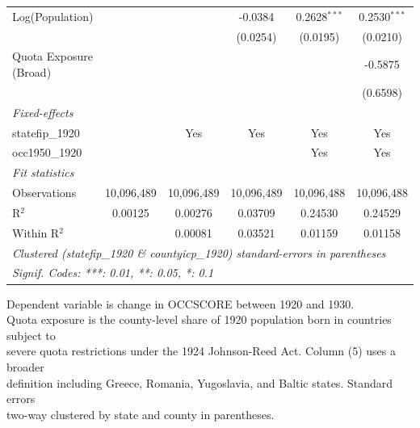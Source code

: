 \begin{table}[htbp]
\begin{tabular}{lccccc}
      Log(Population)        &                &                & -0.0384         & 0.2628$^{***}$  & 0.2530$^{***}$\\   
                             &                &                & (0.0254)        & (0.0195)        & (0.0210)\\   
      Quota Exposure (Broad) &                &                &                 &                 & -0.5875\\   
                             &                &                &                 &                 & (0.6598)\\   
      \midrule
      \emph{Fixed-effects}\\
      statefip\_1920         &                & Yes            & Yes             & Yes             & Yes\\  
      occ1950\_1920          &                &                &                 & Yes             & Yes\\  
      \midrule
      \emph{Fit statistics}\\
      Observations           & 10,096,489     & 10,096,489     & 10,096,489      & 10,096,488      & 10,096,488\\  
      R$^2$                  & 0.00125        & 0.00276        & 0.03709         & 0.24530         & 0.24529\\  
      Within R$^2$           &                & 0.00081        & 0.03521         & 0.01159         & 0.01158\\  
      \midrule \midrule
      \multicolumn{6}{l}{\emph{Clustered (statefip\_1920 \& countyicp\_1920) standard-errors in parentheses}}\\
      \multicolumn{6}{l}{\emph{Signif. Codes: ***: 0.01, **: 0.05, *: 0.1}}\\
   \end{tabular}
   
   \par \raggedright 
   Dependent variable is change in OCCSCORE between 1920 and 1930.\\
   Quota exposure is the county-level share of 1920 population born in countries subject to\\
   severe quota restrictions under the 1924 Johnson-Reed Act. Column (5) uses a broader\\
   definition including Greece, Romania, Yugoslavia, and Baltic states. Standard errors\\
   two-way clustered by state and county in parentheses.
\end{table}


